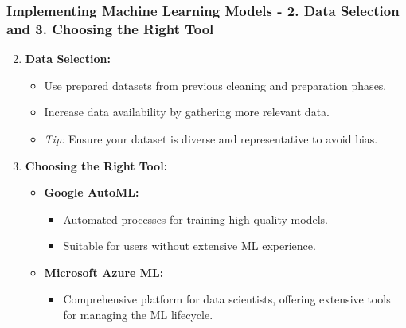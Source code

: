\documentclass[aspectratio=169]{beamer}
\begin{document}
\begin{frame}[fragile]
    \frametitle{Implementing Machine Learning Models - 2. Data Selection and 3. Choosing the Right Tool}
    \begin{enumerate}
        \setcounter{enumi}{1}
        \item \textbf{Data Selection:}
        \begin{itemize}
            \item Use prepared datasets from previous cleaning and preparation phases.
            \item Increase data availability by gathering more relevant data.
            \item \textit{Tip:} Ensure your dataset is diverse and representative to avoid bias.
        \end{itemize}

        \item \textbf{Choosing the Right Tool:}
        \begin{itemize}
            \item \textbf{Google AutoML:}
            \begin{itemize}
                \item Automated processes for training high-quality models.
                \item Suitable for users without extensive ML experience.
            \end{itemize}
            \item \textbf{Microsoft Azure ML:}
            \begin{itemize}
                \item Comprehensive platform for data scientists, offering extensive tools for managing the ML lifecycle.
            \end{itemize}
        \end{itemize}
    \end{enumerate}
\end{frame}
\end{document}
